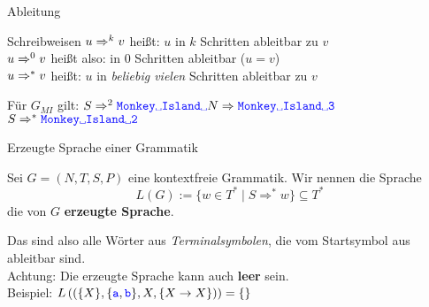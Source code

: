 \begin{frame}{Ableitung}	
	\begin{block}{Schreibweisen}
		$u \Rightarrow^k v$ \quad heißt: $u$ in $k$ Schritten ableitbar zu $v$ \\
		$u \Rightarrow^0 v$ \quad heißt also: in 0 Schritten ableitbar ($u=v$) \\
		\smallskip
		$u \Rightarrow^* v$ \quad heißt: $u$ in \emph{beliebig vielen} Schritten ableitbar zu $v$
	\end{block}
	
	
	\pause
	\begin{Beispiel}
		Für $G_{MI}$ gilt: $S \derives^2 \word{Monkey\sp Island\sp}N \derives \word{Monkey\sp Island\sp3}$\\
		$S \derives^* \word{Monkey\sp Island\sp2}$
	\end{Beispiel}
\end{frame}


\begin{frame}{Erzeugte Sprache einer Grammatik}
	\begin{Definition}
		Sei $G = (N, T, S, P)$ eine kontextfreie Grammatik. Wir nennen die Sprache $$L(G) := \{w \in T^\ast \mid S \Rightarrow^\ast w \} \subseteq T^*$$ die von $G$ \textbf{erzeugte Sprache}.
	\end{Definition} \pause
	Das sind also alle Wörter aus \emph{Terminalsymbolen}, die vom Startsymbol aus ableitbar sind.\\
	\bigskip
	Achtung: Die erzeugte Sprache kann auch \textbf{leer} sein. \\
	Beispiel: \pause $L\left(\left(\{X\},\{\hbox{\textcolor{blue}{\texttt{a}}}, \hbox{\textcolor{blue}{\texttt{b}}}\},X,\{X\to X\}\right)\right) = \{\}$
\end{frame}


